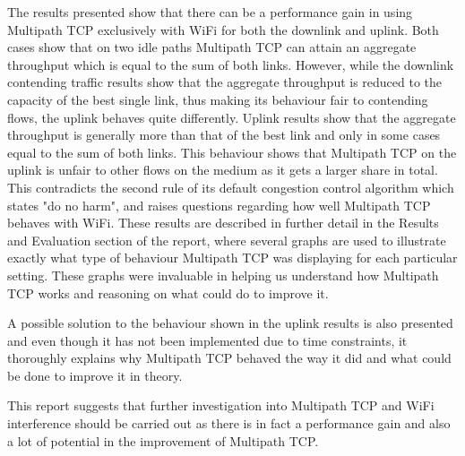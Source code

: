 The results presented show that there can be a performance gain in using Multipath TCP exclusively with WiFi for both the downlink and uplink.
Both cases show that on two idle paths Multipath TCP can attain an aggregate
throughput which is equal to the sum of both links. However, while the downlink 
contending traffic results show that the aggregate throughput is reduced to the 
capacity of the best single link, thus making its behaviour fair to contending 
flows, the uplink behaves quite differently.
Uplink results show that the aggregate throughput is generally more than that of 
the best link and only in some cases equal to the sum of both links. This 
behaviour shows that Multipath TCP on the uplink is unfair to other flows on the 
medium as it gets a larger share in total. This contradicts the second rule of 
its default congestion control algorithm which states "do no harm", and raises 
questions regarding how well Multipath TCP behaves with WiFi.
These results are described in further detail in the Results and Evaluation section of the report, where several graphs are used to illustrate exactly what type of behaviour Multipath TCP was displaying for each particular setting. These graphs were invaluable in helping us understand how Multipath TCP works and reasoning on what could do to improve it.

A possible solution to the behaviour shown in the uplink results is also presented and even though it has not been implemented due to time constraints, it thoroughly explains why Multipath TCP behaved the way it did and what could be done to improve it in theory.

This report suggests that further investigation into Multipath TCP and WiFi interference should be carried out as there is in fact a performance gain and also a lot of potential in the improvement of Multipath TCP.



     
  
